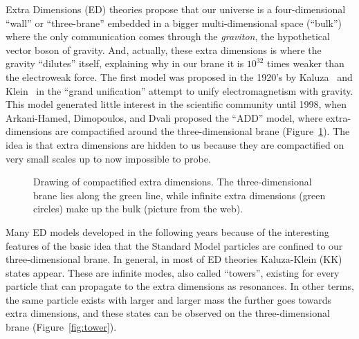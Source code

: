 Extra Dimensions (ED) theories propose that
our universe is a four-dimensional ``wall'' or 
``three-brane'' embedded in a bigger multi-dimensional space 
(``bulk'') where the only communication comes through
the {\it graviton}, the hypothetical vector boson of gravity.
And, actually, these extra dimensions is where the gravity
``dilutes'' itself, explaining why in our brane it is
$10^{32}$ times weaker than the electroweak force.
The first model was proposed in the 1920's by
Kaluza~\cite{Kaluza} and Klein~\cite{Klein} 
in the ``grand unification''
attempt to unify electromagnetism with gravity.
This model generated little interest in the scientific community 
until 1998, when Arkani-Hamed, Dimopoulos, and Dvali
\cite{ArkaniHamed:1998rs} proposed the ``ADD'' model, 
where extra-dimensions are compactified around the 
three-dimensional brane (Figure~\ref{fig:compact}).
The idea is that extra dimensions are hidden to us because
they are compactified on very small scales up to now impossible
to probe.

\begin{figure}[htb]\begin{center}
	\caption{Drawing of compactified extra dimensions. 
          The three-dimensional brane lies along the green
          line, while infinite extra dimensions (green circles)
          make up the bulk (picture from the web). \label{fig:compact}}
\end{center}\end{figure}


Many ED models developed in the following years
because of the interesting features of the
basic idea that the Standard Model particles are confined
to our three-dimensional brane.
In general, in most of ED theories Kaluza-Klein (KK) states
appear. These are infinite modes, also called ``towers'', 
existing for every particle
that can propagate to the extra dimensions as resonances.
In other terms, the same particle exists with larger and
larger mass the further goes towards extra dimensions, and
these states can be observed on the three-dimensional brane
(Figure~\ref{fig:tower}).

